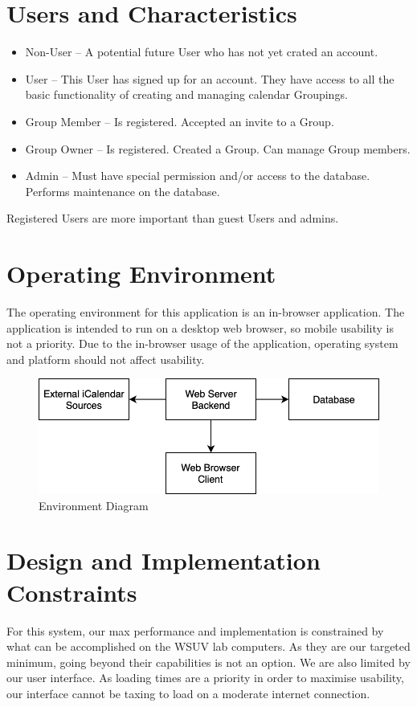 \documentclass{scrreprt}
\begin{document}
\section{Users and Characteristics}
\begin{itemize}
	\item Non-User – A potential future User who has not yet crated an account.
    \item User – This User has signed up for an account. They have access to
all the basic functionality of creating and managing calendar Groupings.
    \item Group Member – Is registered. Accepted an invite to a Group.
    \item Group Owner – Is registered. Created a Group. Can manage Group members.
    \item Admin – Must have special permission and/or access to the database. Performs
maintenance on the database.
\end{itemize}
Registered Users are more important than guest Users and admins.

\section{Operating Environment}
The operating environment for this application is an in-browser application. The
application is intended to run on a desktop web browser, so mobile usability is
not a priority. Due to the in-browser usage of the application, operating system
and platform should not affect usability.

\begin{figure}[ht]
    \centering
    \includegraphics[width=1.0\textwidth]{systemDiagram}
    \caption{Environment Diagram}
    \label{fig:environment}
\end{figure}

\section{Design and Implementation Constraints}
For this system, our max performance and implementation is constrained by what
can be accomplished on the WSUV lab computers. As they are our targeted minimum,
going beyond their capabilities is not an option. We are also limited by our user
interface. As loading times are a priority in order to maximise usability, our
interface cannot be taxing to load on a moderate internet connection.
\end{document}
